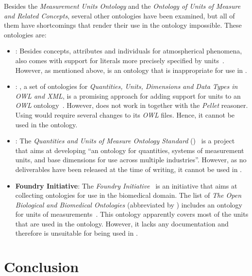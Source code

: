 Besides the \emph{Measurement Units Ontology} and the \emph{Ontology of Units of Measure and Related Concepts}, several other ontologies have been examined, but all of them have shortcomings that render their use in the \smarthomeweather ontology impossible. These ontologies are:

\begin{itemize}
  \item \textbf{}: Besides concepts, attributes and individuals for atmospherical phenomena,  also comes with support for literals more precisely specified by units~\cite{SWEET1}. However, as mentioned above,  is an ontology that is inappropriate for use in \smarthomeweather.
  
  \item \textbf{}: , a set of ontologies for \emph{Quantities, Units, Dimensions and Data Types in OWL and XML}, is a promising approach for adding support for units to an \emph{OWL} ontology~\cite{QUDT}. However,  does not work in \protege together with the \emph{Pellet} reasoner. Using  would require several changes to its \emph{OWL} files. Hence, it cannot be used in the \smarthomeweather ontology.
  
  \item \textbf{}: The \emph{ Quantities and Units of Measure Ontology Standard} ()~\cite{QUOMOS} is a project that aims at developing ``an ontology for quantities, systems of measurement units, and base dimensions for use across multiple industries''. However, as no deliverables have been released at the time of writing, it cannot be used in \smarthomeweather.
  
  \item \textbf{ Foundry Initiative}: The \emph{ Foundry Initiative}~\cite{OBOFoundry} is an initiative that aims at collecting ontologies for use in the biomedical domain. The list of \emph{The Open Biological and Biomedical Ontologies} (abbreviated by ) includes an ontology for units of measurements~\cite{OBOUnits1,OBOUnits2}. This ontology apparently covers most of the units that are used in the \smarthomeweather ontology. However, it lacks any documentation and therefore is unsuitable for being used in \smarthomeweather.
\end{itemize}

\section{Conclusion}

